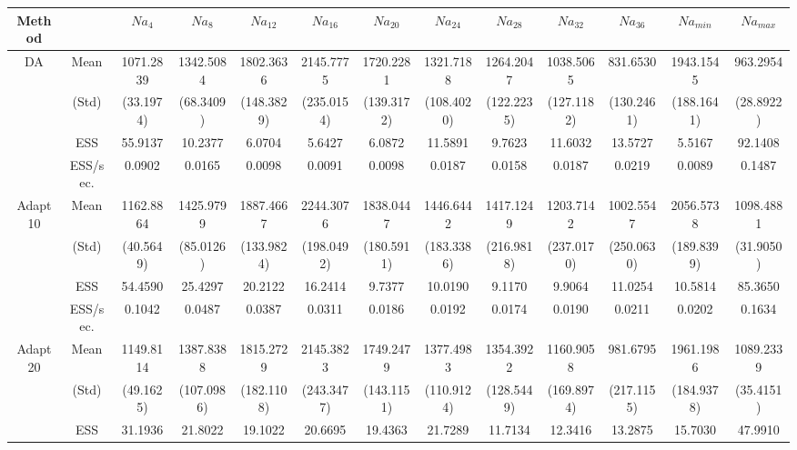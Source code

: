 {\setlength{\tabcolsep}{1.5pt}
{\scriptsize 
{ \renewcommand{\arraystretch}{1.2} 
\begin{table} 
\hspace*{-3.5cm} 
\begin{tabular}{cc ccc ccc ccc cc} 
\hline 
 Method & & $ Na_{4}$ &$ Na_{8}$ &$ Na_{12}$ &$ Na_{16}$ &$ Na_{20}$ &$ Na_{24}$ &$ Na_{28}$ &$ Na_{32}$ &$ Na_{36}$ &$ Na_{min}$ &$ Na_{max}$  \\ \hline  \hline
\rowcolor{LightCyan} 
DA & Mean 
 & 1071.2839  & 1342.5084  & 1802.3636  & 2145.7775  & 1720.2281  & 1321.7188  & 1264.2047  & 1038.5065  & 831.6530  & 1943.1545  & 963.2954  \\  [0.75ex] 
 & (Std) 
 & (33.1974)  & (68.3409)  & (148.3829)  & (235.0154)  & (139.3172)  & (108.4020)  & (122.2235)  & (127.1182)  & (130.2461)  & (188.1641)  & (28.8922)  \\  [0.75ex] 
 & ESS 
 & 55.9137  & 10.2377  & 6.0704  & 5.6427  & 6.0872  & 11.5891  & 9.7623  & 11.6032  & 13.5727  & 5.5167  & 92.1408  \\  [0.75ex] 
[619.80 s]  & ESS/sec. 
& 0.0902 & 0.0165 & 0.0098 & 0.0091 & 0.0098 & 0.0187 & 0.0158 & 0.0187 & 0.0219 & 0.0089 & 0.1487  \\  [1.3ex] 
\rowcolor{LightCyan} 
Adapt10 & Mean 
 & 1162.8864  & 1425.9799  & 1887.4667  & 2244.3076  & 1838.0447  & 1446.6442  & 1417.1249  & 1203.7142  & 1002.5547  & 2056.5738  & 1098.4881  \\  [0.75ex] 
 & (Std) 
 & (40.5649)  & (85.0126)  & (133.9824)  & (198.0492)  & (180.5911)  & (183.3386)  & (216.9818)  & (237.0170)  & (250.0630)  & (189.8399)  & (31.9050)  \\  [0.75ex] 
 & ESS 
 & 54.4590  & 25.4297  & 20.2122  & 16.2414  & 9.7377  & 10.0190  & 9.1170  & 9.9064  & 11.0254  & 10.5814  & 85.3650  \\  [0.75ex] 
[522.57 s]  & ESS/sec. 
& 0.1042 & 0.0487 & 0.0387 & 0.0311 & 0.0186 & 0.0192 & 0.0174 & 0.0190 & 0.0211 & 0.0202 & 0.1634  \\  [1.3ex] 
\rowcolor{LightCyan} 
Adapt20 & Mean 
 & 1149.8114  & 1387.8388  & 1815.2729  & 2145.3823  & 1749.2479  & 1377.4983  & 1354.3922  & 1160.9058  & 981.6795  & 1961.1986  & 1089.2339  \\  [0.75ex] 
 & (Std) 
 & (49.1625)  & (107.0986)  & (182.1108)  & (243.3477)  & (143.1151)  & (110.9124)  & (128.5449)  & (169.8974)  & (217.1155)  & (184.9378)  & (35.4151)  \\  [0.75ex] 
 & ESS 
 & 31.1936  & 21.8022  & 19.1022  & 20.6695  & 19.4363  & 21.7289  & 11.7134  & 12.3416  & 13.2875  & 15.7030  & 47.9910  \\  [0.75ex] 

\end{tabular}
\end{table}}}}
